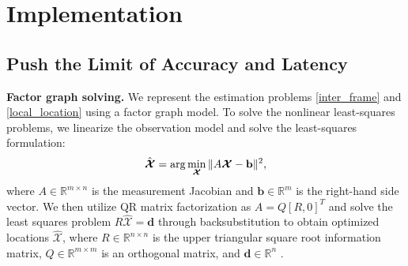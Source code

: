 \section{Implementation} \label{I}
\subsection{Push the Limit of Accuracy and Latency} \label{I-1}
\textbf{Factor graph solving.}
We represent the estimation problems \eqn \eqref{inter_frame} and \eqn \eqref{local_location} using a factor graph model. To solve the nonlinear least-squares problems, we linearize the observation model and solve the least-squares formulation:
\begin{equation}
\vspace{-0.1cm}
\hat{\boldsymbol{\mathcal{X}}}=\arg \min _{\boldsymbol{\mathcal{X}}}\|A \boldsymbol{\mathcal{X}}-\mathbf{b}\|^2,
\end{equation}
where $A \in \mathbb{R}^{m \times n}$ is the measurement Jacobian and $\mathbf{b} \in \mathbb{R}^m$ is the right-hand side vector. We then utilize QR matrix factorization \cite{bischof1998computing} as $A = Q[R, 0]^T$ and solve the least squares problem $R \hat{\boldsymbol{\mathcal{X}}}=\mathbf{d}$ through backsubstitution to obtain optimized locations $\hat{\boldsymbol{\mathcal{X}}}$, where $R \in \mathbb{R}^{n \times n}$ is the upper triangular square root information matrix, $Q \in \mathbb{R}^{m \times m}$ is an orthogonal matrix, and $\textbf{d} \in \mathbb{R}^n$ \cite{kaess2008isam}. 
